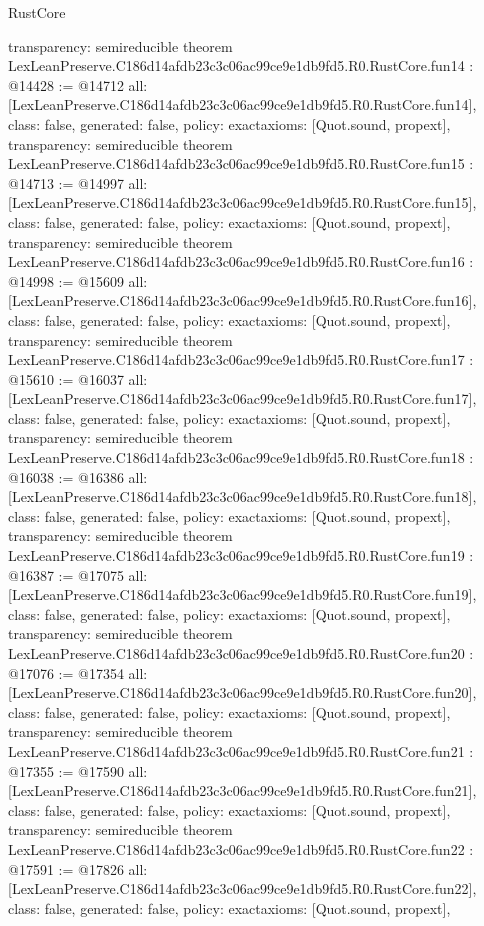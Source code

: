 \begin{lexlean}{RustCore}
\begin{coremodule}
{  transparency: semireducible
}
theorem LexLeanPreserve.C186d14afdb23c3c06ac99ce9e1db9fd5.R0.RustCore.fun14 : @14428 := @14712 {
  all: [LexLeanPreserve.C186d14afdb23c3c06ac99ce9e1db9fd5.R0.RustCore.fun14],
  class: false,
  generated: false,
  policy: exact{axioms: [Quot.sound, propext]},
  transparency: semireducible
}
theorem LexLeanPreserve.C186d14afdb23c3c06ac99ce9e1db9fd5.R0.RustCore.fun15 : @14713 := @14997 {
  all: [LexLeanPreserve.C186d14afdb23c3c06ac99ce9e1db9fd5.R0.RustCore.fun15],
  class: false,
  generated: false,
  policy: exact{axioms: [Quot.sound, propext]},
  transparency: semireducible
}
theorem LexLeanPreserve.C186d14afdb23c3c06ac99ce9e1db9fd5.R0.RustCore.fun16 : @14998 := @15609 {
  all: [LexLeanPreserve.C186d14afdb23c3c06ac99ce9e1db9fd5.R0.RustCore.fun16],
  class: false,
  generated: false,
  policy: exact{axioms: [Quot.sound, propext]},
  transparency: semireducible
}
theorem LexLeanPreserve.C186d14afdb23c3c06ac99ce9e1db9fd5.R0.RustCore.fun17 : @15610 := @16037 {
  all: [LexLeanPreserve.C186d14afdb23c3c06ac99ce9e1db9fd5.R0.RustCore.fun17],
  class: false,
  generated: false,
  policy: exact{axioms: [Quot.sound, propext]},
  transparency: semireducible
}
theorem LexLeanPreserve.C186d14afdb23c3c06ac99ce9e1db9fd5.R0.RustCore.fun18 : @16038 := @16386 {
  all: [LexLeanPreserve.C186d14afdb23c3c06ac99ce9e1db9fd5.R0.RustCore.fun18],
  class: false,
  generated: false,
  policy: exact{axioms: [Quot.sound, propext]},
  transparency: semireducible
}
theorem LexLeanPreserve.C186d14afdb23c3c06ac99ce9e1db9fd5.R0.RustCore.fun19 : @16387 := @17075 {
  all: [LexLeanPreserve.C186d14afdb23c3c06ac99ce9e1db9fd5.R0.RustCore.fun19],
  class: false,
  generated: false,
  policy: exact{axioms: [Quot.sound, propext]},
  transparency: semireducible
}
theorem LexLeanPreserve.C186d14afdb23c3c06ac99ce9e1db9fd5.R0.RustCore.fun20 : @17076 := @17354 {
  all: [LexLeanPreserve.C186d14afdb23c3c06ac99ce9e1db9fd5.R0.RustCore.fun20],
  class: false,
  generated: false,
  policy: exact{axioms: [Quot.sound, propext]},
  transparency: semireducible
}
theorem LexLeanPreserve.C186d14afdb23c3c06ac99ce9e1db9fd5.R0.RustCore.fun21 : @17355 := @17590 {
  all: [LexLeanPreserve.C186d14afdb23c3c06ac99ce9e1db9fd5.R0.RustCore.fun21],
  class: false,
  generated: false,
  policy: exact{axioms: [Quot.sound, propext]},
  transparency: semireducible
}
theorem LexLeanPreserve.C186d14afdb23c3c06ac99ce9e1db9fd5.R0.RustCore.fun22 : @17591 := @17826 {
  all: [LexLeanPreserve.C186d14afdb23c3c06ac99ce9e1db9fd5.R0.RustCore.fun22],
  class: false,
  generated: false,
  policy: exact{axioms: [Quot.sound, propext]},
}
\end{coremodule}
\end{lexlean}

